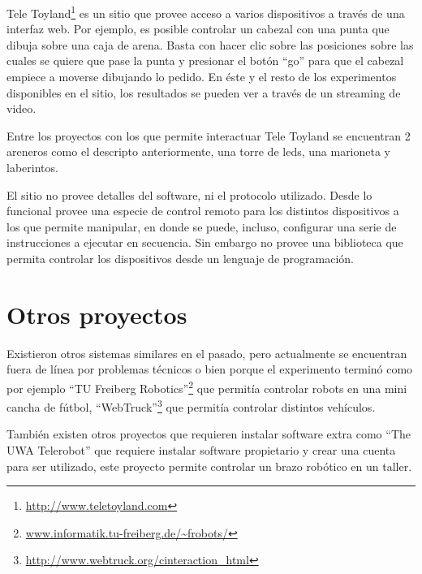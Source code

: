 Tele Toyland\footnote{\url{http://www.teletoyland.com}} es un sitio que provee acceso a varios dispositivos a través de una interfaz
web. Por ejemplo, es posible controlar un cabezal con una punta que dibuja sobre
una caja de arena. Basta con hacer clic sobre las posiciones sobre las cuales
se quiere que pase la punta y presionar el botón ``go'' para que el cabezal
empiece a moverse dibujando lo pedido. En éste y el resto de los experimentos
disponibles en el sitio, los resultados se pueden ver a través de un streaming
de video.

Entre los proyectos con los que permite interactuar Tele Toyland
se encuentran  2 areneros como el descripto
anteriormente, una torre de leds, una marioneta y laberintos.

El sitio no provee detalles del software, ni el protocolo utilizado. Desde
lo funcional
provee una especie de control remoto para los distintos dispositivos a los
que permite
manipular, en donde se puede, incluso, configurar una serie de instrucciones a ejecutar
en secuencia. Sin embargo no provee una biblioteca que permita controlar
los dispositivos desde un lenguaje de programación.


\section{Otros proyectos}




Existieron otros sistemas similares en el pasado, pero actualmente se
encuentran fuera de línea por problemas técnicos o bien porque el
experimento terminó como por ejemplo
``TU Freiberg Robotics''\footnote{\url{www.informatik.tu-freiberg.de/\~frobots/}}
que permitía controlar robots en una mini cancha de fútbol,
``WebTruck''\footnote{\url{http://www.webtruck.org/cinteraction_html}} que
permitía controlar distintos vehículos.

También existen otros proyectos que requieren instalar software extra
como ``The UWA Telerobot'' que requiere instalar software propietario
y crear una cuenta para ser utilizado, este proyecto permite controlar
un brazo robótico en un taller.

